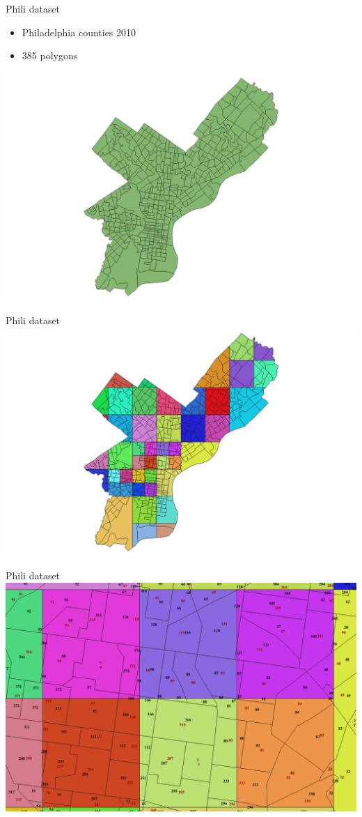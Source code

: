 \documentclass{beamer}
\begin{document}
\begin{frame}{Phili dataset}
    \begin{itemize}
        \item Philadelphia counties 2010
        \item 385 polygons
    \end{itemize}

    \centering 
    \includegraphics[width=0.8\linewidth]{figures/PhiliTest0.png} 
\end{frame}

\begin{frame}{Phili dataset}
    \centering 
    \includegraphics[width=0.8\linewidth]{figures/PhiliTest1.png} 
\end{frame}

\begin{frame}{Phili dataset}
    \centering 
    \includegraphics[width=0.9\linewidth]{figures/PhiliTest2.png} 
\end{frame}
\end{document}
